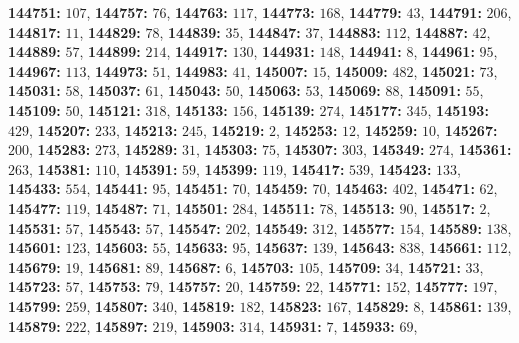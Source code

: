 \textsf{\bfseries 144751:} $107$, \textsf{\bfseries 144757:} $76$, \textsf{\bfseries 144763:} $117$, \textsf{\bfseries 144773:} $168$, \textsf{\bfseries 144779:} $43$, \textsf{\bfseries 144791:} $206$, \textsf{\bfseries 144817:} $11$, \textsf{\bfseries 144829:} $78$, \textsf{\bfseries 144839:} $35$, \textsf{\bfseries 144847:} $37$, \textsf{\bfseries 144883:} $112$, \textsf{\bfseries 144887:} $42$, \textsf{\bfseries 144889:} $57$, \textsf{\bfseries 144899:} $214$, \textsf{\bfseries 144917:} $130$, \textsf{\bfseries 144931:} $148$, \textsf{\bfseries 144941:} $8$, \textsf{\bfseries 144961:} $95$, \textsf{\bfseries 144967:} $113$, \textsf{\bfseries 144973:} $51$, \textsf{\bfseries 144983:} $41$, \textsf{\bfseries 145007:} $15$, \textsf{\bfseries 145009:} $482$, \textsf{\bfseries 145021:} $73$, \textsf{\bfseries 145031:} $58$, \textsf{\bfseries 145037:} $61$, \textsf{\bfseries 145043:} $50$, \textsf{\bfseries 145063:} $53$, \textsf{\bfseries 145069:} $88$, \textsf{\bfseries 145091:} $55$, \textsf{\bfseries 145109:} $50$, \textsf{\bfseries 145121:} $318$, \textsf{\bfseries 145133:} $156$, \textsf{\bfseries 145139:} $274$, \textsf{\bfseries 145177:} $345$, \textsf{\bfseries 145193:} $429$, \textsf{\bfseries 145207:} $233$, \textsf{\bfseries 145213:} $245$, \textsf{\bfseries 145219:} $2$, \textsf{\bfseries 145253:} $12$, \textsf{\bfseries 145259:} $10$, \textsf{\bfseries 145267:} $200$, \textsf{\bfseries 145283:} $273$, \textsf{\bfseries 145289:} $31$, \textsf{\bfseries 145303:} $75$, \textsf{\bfseries 145307:} $303$, \textsf{\bfseries 145349:} $274$, \textsf{\bfseries 145361:} $263$, \textsf{\bfseries 145381:} $110$, \textsf{\bfseries 145391:} $59$, \textsf{\bfseries 145399:} $119$, \textsf{\bfseries 145417:} $539$, \textsf{\bfseries 145423:} $133$, \textsf{\bfseries 145433:} $554$, \textsf{\bfseries 145441:} $95$, \textsf{\bfseries 145451:} $70$, \textsf{\bfseries 145459:} $70$, \textsf{\bfseries 145463:} $402$, \textsf{\bfseries 145471:} $62$, \textsf{\bfseries 145477:} $119$, \textsf{\bfseries 145487:} $71$, \textsf{\bfseries 145501:} $284$, \textsf{\bfseries 145511:} $78$, \textsf{\bfseries 145513:} $90$, \textsf{\bfseries 145517:} $2$, \textsf{\bfseries 145531:} $57$, \textsf{\bfseries 145543:} $57$, \textsf{\bfseries 145547:} $202$, \textsf{\bfseries 145549:} $312$, \textsf{\bfseries 145577:} $154$, \textsf{\bfseries 145589:} $138$, \textsf{\bfseries 145601:} $123$, \textsf{\bfseries 145603:} $55$, \textsf{\bfseries 145633:} $95$, \textsf{\bfseries 145637:} $139$, \textsf{\bfseries 145643:} $838$, \textsf{\bfseries 145661:} $112$, \textsf{\bfseries 145679:} $19$, \textsf{\bfseries 145681:} $89$, \textsf{\bfseries 145687:} $6$, \textsf{\bfseries 145703:} $105$, \textsf{\bfseries 145709:} $34$, \textsf{\bfseries 145721:} $33$, \textsf{\bfseries 145723:} $57$, \textsf{\bfseries 145753:} $79$, \textsf{\bfseries 145757:} $20$, \textsf{\bfseries 145759:} $22$, \textsf{\bfseries 145771:} $152$, \textsf{\bfseries 145777:} $197$, \textsf{\bfseries 145799:} $259$, \textsf{\bfseries 145807:} $340$, \textsf{\bfseries 145819:} $182$, \textsf{\bfseries 145823:} $167$, \textsf{\bfseries 145829:} $8$, \textsf{\bfseries 145861:} $139$, \textsf{\bfseries 145879:} $222$, \textsf{\bfseries 145897:} $219$, \textsf{\bfseries 145903:} $314$, \textsf{\bfseries 145931:} $7$, \textsf{\bfseries 145933:} $69$, 
